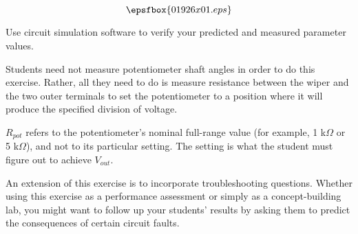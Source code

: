 

$$\epsfbox{01926x01.eps}$$

\vfil \eject






Use circuit simulation software to verify your predicted and measured parameter values.







Students need not measure potentiometer shaft angles in order to do this exercise.  Rather, all they need to do is measure resistance between the wiper and the two outer terminals to set the potentiometer to a position where it will produce the specified division of voltage.

$R_{pot}$ refers to the potentiometer's nominal full-range value (for example, 1 k$\Omega$ or 5 k$\Omega$), and not to its particular setting.  The setting is what the student must figure out to achieve $V_{out}$.

An extension of this exercise is to incorporate troubleshooting questions.  Whether using this exercise as a performance assessment or simply as a concept-building lab, you might want to follow up your students' results by asking them to predict the consequences of certain circuit faults.




